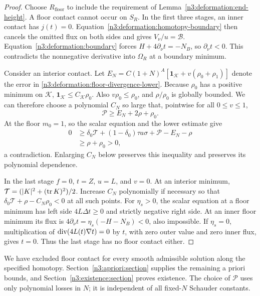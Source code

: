 \begin{proof}
Choose $R_{\mathrm{floor}}$ to include the requirement of
Lemma~\ref{n3:deformation:end-height}. A floor contact cannot occur on $S_R$.
In the first three stages, an inner contact has $j(t)=0$.
Equation~\eqref{n3:deformation:homotopy-boundary} then cancels the omitted
flux on both sides and gives $V_\nu/u=\mathcal B$.
Equation~\eqref{n3:deformation:boundary} forces
$H+4\partial_\nu t=-N_B$, so $\partial_\nu t<0$.
This contradicts the nonnegative derivative into $\Omega_R$ at a
boundary minimum.

Consider an interior contact. Let
$E_N=C(1+N)^A[\mathbf1_{\mathcal K}+v(\rho_0+\rho_1)]$
denote the error in \eqref{n3:deformation:floor-divergence-lower}.
Because $\rho_0$ has a positive minimum on $\mathcal K$,
$\mathbf1_{\mathcal K}\le C_{\mathcal K}\rho_0$.
Also $v\rho_0\le\rho_0$, and $\rho/\rho_0$ is globally bounded.
We can therefore choose a polynomial $C_N$ so large that, pointwise
for all $0\le v\le1$,
\begin{equation}\label{n3:deformation:penalty-choice}
 \mathcal P\ge E_N+2\rho+\rho_0.
\end{equation}
At the floor $m_0=1$, so the scalar equation and the lower estimate give
\[
 \begin{split}
 0
 &\ge \delta_0\mathcal T+(1-\delta_0)\tau a\sigma
                     +\mathcal P-E_N-\rho\\
 &\ge \rho+\rho_0>0,
 \end{split}
\]
a contradiction. Enlarging $C_N$ below preserves this inequality and
preserves its polynomial dependence.

In the last stage $f=0$, $t=Z$, $u=L$, and $v=0$.
At an interior minimum,
$\mathcal T=(|K|^2+(\operatorname{tr} K)^2)/2$.
Increase $C_N$ polynomially if necessary so that
$\delta_0\mathcal T+\rho-C_N\rho_0<0$ at all such points.
For $\eta_s>0$, the scalar equation at a floor minimum has left side
$4L\Delta t\ge0$ and strictly negative right side.
At an inner floor minimum its flux is
$4\partial_\nu t=\eta_s(-H-N_B)<0$, also impossible.
If $\eta_s=0$, multiplication of
$\operatorname{div}(4L(t)\nabla t)=0$ by $t$, with zero outer value and zero inner
flux, gives $t=0$.
Thus the last stage has no floor contact either.
\end{proof}

We have excluded floor contact for every smooth admissible solution
along the specified homotopy. Section~\ref{n3:apriori:section} supplies the
remaining a priori bounds, and Section~\ref{n3:existence:section} proves
existence. The choice of $\mathcal P$ uses only polynomial losses in $N$;
it is independent of all fixed-$N$ Schauder constants.
